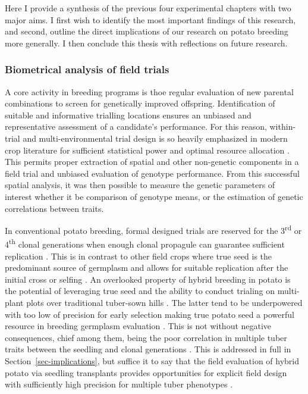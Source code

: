 \documentclass[
]{article}
\begin{document}
Here I provide a synthesis of the previous four experimental chapters
with two major aims. I first wish to identify the most important
findings of this research, and second, outline the direct implications
of our research on potato breeding more generally. I then conclude this
thesis with reflections on future research.

\subsubsection{Biometrical analysis of field
trials}\label{biometrical-analysis-of-field-trials}

A core activity in breeding programs is thoe regular evaluation of new
parental combinations to screen for genetically improved offspring.
Identification of suitable and informative trialling locations ensures
an unbiased and representative assessment of a candidate's performance.
For this reason, within-trial and multi-environmental trial design is so
heavily emphasized in modern crop literature for sufficient statistical
power and optimal resource allocation \autocite{Schoemaker2024}. This
permits proper extraction of spatial and other non-genetic components in
a field trial and unbiased evaluation of genotype performance. From this
successful spatial analysis, it was then possible to measure the genetic
parameters of interest whether it be comparison of genotype means, or
the estimation of genetic correlations between traits.

In conventional potato breeding, formal designed trials are reserved for
the 3\textsuperscript{rd} or 4\textsuperscript{th} clonal generations
when enough clonal propagule can guarantee sufficient replication
\autocite{Gopal2015,Paget2017}. This is in contrast to other field crops
where true seed is the predominant source of germplasm and allows for
suitable replication after the initial cross or selfing
\autocite{Zystro2018}. An overlooked property of hybrid breeding in
potato is the potential of leveraging true seed and the ability to
conduct trialing on multi-plant plots over traditional tuber-sown hills
\autocite{Davies1974,Pallais1991}. The latter tend to be underpowered
with too low of precision for early selection making true potato seed a
powerful resource in breeding germplasm evaluation
\autocite{Storck2011,Stockem2021}. This is not without negative
consequences, chief among them, being the poor correlation in multiple
tuber traits between the seedling and clonal generations
\autocite{Anderson1981,Ortiz1997,Gu2024}. This is addressed in full in
Section~\ref{sec-implications}, but suffice it to say that the field
evaluation of hybrid potato via seedling transplants provides
opportunities for explicit field design with sufficiently high precision
for multiple tuber phenotypes \autocite{VanDijk2021a}.
\end{document}

